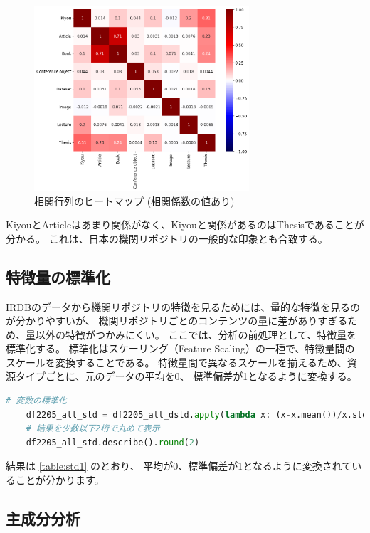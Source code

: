 \documentclass[submit,noauthor]{ono}
\begin{document}
\begin{figure}[h]
	\includegraphics[width=8cm]{./picture/heatmap.png}
	\caption{相関行列のヒートマップ (相関係数の値あり)}
	\label{fig:heatmap12}
\end{figure}

KiyouとArticleはあまり関係がなく、Kiyouと関係があるのはThesisであることが分かる。
これは、日本の機関リポジトリの一般的な印象とも合致する。

\subsection{特徴量の標準化}

IRDBのデータから機関リポジトリの特徴を見るためには、量的な特徴を見るのが分かりやすいが、
機関リポジトリごとのコンテンツの量に差がありすぎるため、量以外の特徴がつかみにくい。
ここでは、分析の前処理として、特徴量を標準化する。
標準化はスケーリング（Feature Scaling）の一種で、特徴量間のスケールを変換することである。
特徴量間で異なるスケールを揃えるため、資源タイプごとに、元のデータの平均を0、
標準偏差が1となるように変換する。

\begin{lstlisting}[language=Python,breaklines]
	# 変数の標準化
	df2205_all_std = df2205_all_dstd.apply(lambda x: (x-x.mean())/x.std(), axis=0)
	# 結果を少数以下2桁で丸めて表示
	df2205_all_std.describe().round(2)
\end{lstlisting}

結果は \ref{table:std1} のとおり、
平均が0、標準偏差が1となるように変換されていることが分かります。

\subsection{主成分分析}
\end{document}
